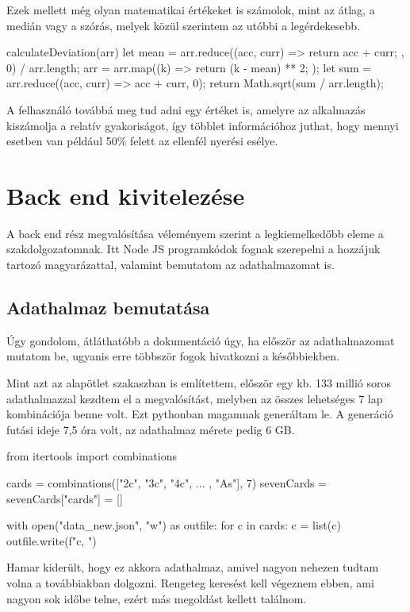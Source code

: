 Ezek mellett még olyan matematikai értékeket is számolok, mint az átlag, a medián vagy a szórás, melyek közül szerintem az utóbbi a legérdekesebb.

\begin{python}
        calculateDeviation(arr) {
      let mean =
        arr.reduce((acc, curr) => {
          return acc + curr;
        }, 0) / arr.length;
      arr = arr.map((k) => {
        return (k - mean) ** 2;
      });
      let sum = arr.reduce((acc, curr) => acc + curr, 0);
      return Math.sqrt(sum / arr.length);
    }
\end{python}

A felhasználó továbbá meg tud adni egy értéket is, amelyre az alkalmazás kiszámolja a relatív gyakoriságot, így többlet információhoz juthat, hogy mennyi esetben van például 50\% felett az ellenfél nyerési esélye.

\section{Back end kivitelezése}
A back end rész megvalósítása véleményem szerint a legkiemelkedőbb eleme a szakdolgozatomnak. Itt Node JS programkódok fognak szerepelni a hozzájuk tartozó magyarázattal, valamint bemutatom az adathalmazomat is.

\subsection{Adathalmaz bemutatása}
Úgy gondolom, átláthatóbb a dokumentáció úgy, ha először az adathalmazomat mutatom be, ugyanis erre többször fogok hivatkozni a későbbiekben. 

Mint azt az alapötlet szakaszban is említettem, először egy kb. 133 millió soros adathalmazzal kezdtem el a megvalósítást, melyben az összes lehetséges 7 lap kombinációja benne volt. Ezt pythonban magamnak generáltam le. A generáció futási ideje 7,5 óra volt, az adathalmaz mérete pedig 6 GB.

\begin{python}
from itertools import combinations

cards = combinations(["2c", "3c", "4c", ... , "As"], 7)
sevenCards = {}
sevenCards["cards"] = []

with open("data_new.json", "w") as outfile:
    for c in cards:
        c = list(c)
        outfile.write(f"{c}, \n")
\end{python}

Hamar kiderült, hogy ez akkora adathalmaz, amivel nagyon nehezen tudtam volna a továbbiakban dolgozni. Rengeteg keresést kell végeznem ebben, ami nagyon sok időbe telne, ezért más megoldást kellett találnom.

